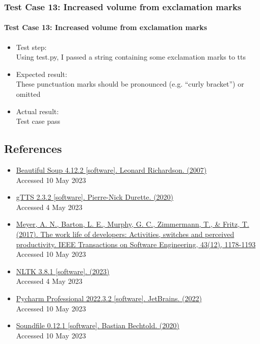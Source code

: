\documentclass{article}
\begin{document}
\subsubsection{Test Case 13: Increased volume from exclamation marks}
\paragraph{Test Case 13: Increased volume from exclamation marks}
\begin{itemize}
\item Test step: \\
    Using test.py, I passed a string containing some exclamation marks to tts
\item Expected result: \\
    These punctuation marks should be pronounced (e.g. “curly bracket”) or omitted
\item Actual result: \\
    Test case pass
\end{itemize}



\subsection{References}
\begin{itemize}
    \item \href{https://www.crummy.com/software/BeautifulSoup/}{Beautiful Soup 4.12.2 [software]. Leonard Richardson. (2007)}\\Accessed 10 May 2023
    \item \href{https://gtts.readthedocs.io/_/downloads/en/v2.1.1/pdf/}{gTTS 2.3.2 [software]. Pierre-Nick Durette. (2020)}
    \\Accessed 4 May 2023
    \item \href{https://ieeexplore.ieee.org/abstract/document/7829407}{Meyer, A. N., Barton, L. E., Murphy, G. C., Zimmermann, T., \& Fritz, T. (2017). The work life of developers: Activities, switches and perceived productivity. IEEE Transactions on Software Engineering, 43(12), 1178-1193} \\
    Accessed 10 May 2023
    \item \href{https://www.nltk.org/index.html}{NLTK 3.8.1 [software]. (2023)}\\ 
    Accessed 4 May 2023
    \item \href{https://www.jetbrains.com/pycharm/}{Pycharm Professional 2022.3.2 [software]. JetBrains. (2022)}
    \\ Accessed 10 May 2023
    \item \href{https://pysoundfile.readthedocs.io/en/latest/}{Soundfile 0.12.1 [software]. Bastian Bechtold. (2020)} \\
    Accessed 10 May 2023
\end{itemize}
\end{document}
